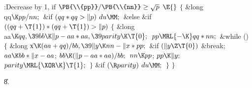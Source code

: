\Y\B\4:Decrease  by 1, if $\PB{\\{pp}}/\PB{\\{nn}}\ge\sqrt p$%
\X${}\E{}$\6
${}\{{}$\5
\1\&{long} \\{qq}${}\K\\{pp}/\\{nn};{}$\7
\&{if} ${}(\\{qq}*\\{qq}>\|p){}$\1\5
${}\\{du}\MM;{}$\2\6
\&{else} \&{if} ${}((\\{qq}+\T{1})*(\\{qq}+\T{1})>\|p){}$\5
${}\{{}$\1\6
\&{long} \\{aa}${}\K\\{qq},\39\\{bb}\K\|p-\\{aa}*\\{aa},\39\\{parity}\K%
\T{0};{}$\7
${}\\{pp}\MRL{-{\K}}\\{qq}*\\{nn};{}$\6
\&{while} ()\5
${}\{{}$\1\6
\&{long} \|x${}\K(\\{aa}+\\{qq})/\\{bb},\39\|y\K\\{nn}-\|x*\\{pp};{}$\7
\&{if} ${}(\|y\Z\T{0}){}$\1\5
\&{break};\2\6
${}\\{aa}\K\\{bb}*\|x-\\{aa}{}$;\6
${}\\{bb}\K(\|p-\\{aa}*\\{aa})/\\{bb};{}$\6
${}\\{nn}\K\\{pp}{}$;\5
${}\\{pp}\K\|y;{}$\6
${}\\{parity}\MRL{{\XOR}{\K}}\T{1};{}$\6
\4${}\}{}$\2\6
\&{if} ${}(\R\\{parity}){}$\1\5
${}\\{du}\MM;{}$\2\6
\4${}\}{}$\2\6
\4${}\}{}$\2\par
\U8.\fi

